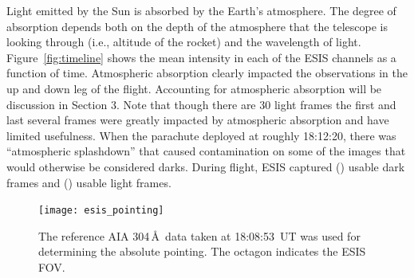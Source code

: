 		
		Light emitted by the Sun is absorbed by the Earth's atmosphere.  The degree of absorption depends both on the depth of the atmosphere that the telescope is looking through (i.e., altitude of the rocket) and the wavelength of light.  Figure~\ref{fig:timeline} shows the mean intensity in each of the ESIS channels as a function of time.  Atmospheric absorption clearly impacted the observations in the up and down leg of the flight.  Accounting for atmospheric absorption will be discussion in Section 3.  Note that though there are 30 light frames the first and last several frames were greatly impacted by atmospheric absorption and have limited usefulness.  
		When the  parachute  deployed at roughly 18:12:20, there was  ``atmospheric splashdown'' that caused contamination on some of the images that would otherwise be considered darks.   During flight, ESIS captured () \rts{\numDarkFrames} usable dark frames and () \rts{\numDataFrames} usable light frames. 
		
		
		\begin{figure}[ht]
			\begin{center}
				\texttt{[image: esis\_pointing]}
				\caption{The reference AIA 304\,\AA\ data taken at 18:08:53~UT was used for determining the absolute pointing. The octagon indicates the ESIS FOV.}
				\label{fig:fov}
			\end{center}
		\end{figure}
	

